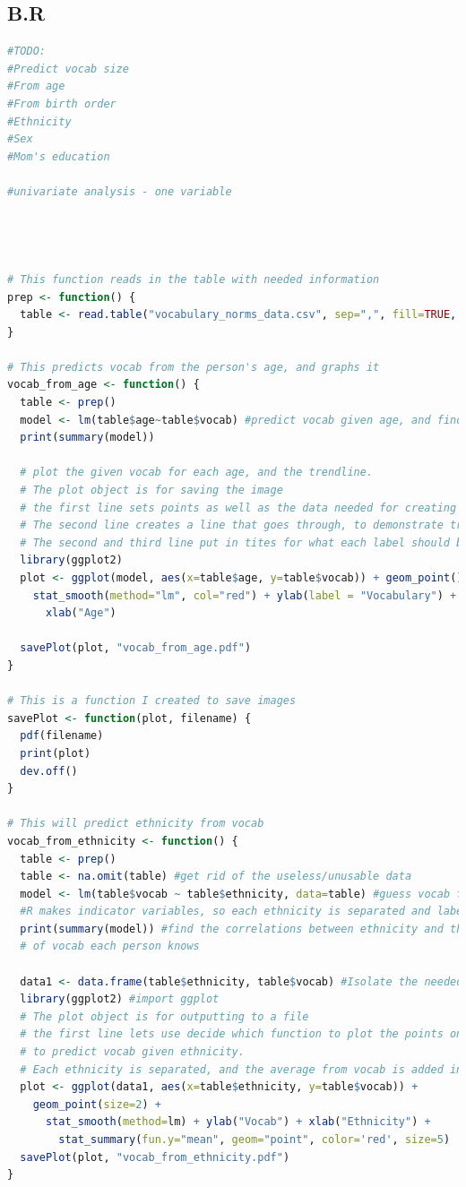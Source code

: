 \documentclass{article}
\begin{document}
    \subsection*{B.R}
        \begin{lstlisting}[language=R]
#TODO:
#Predict vocab size 
#From age
#From birth order
#Ethnicity
#Sex
#Mom's education

#univariate analysis - one variable




# This function reads in the table with needed information
prep <- function() {
  table <- read.table("vocabulary_norms_data.csv", sep=",", fill=TRUE, header=TRUE)
}

# This predicts vocab from the person's age, and graphs it
vocab_from_age <- function() {
  table <- prep()
  model <- lm(table$age~table$vocab) #predict vocab given age, and find correlation
  print(summary(model))

  # plot the given vocab for each age, and the trendline.
  # The plot object is for saving the image
  # the first line sets points as well as the data needed for creating the graph
  # The second line creates a line that goes through, to demonstrate trend.
  # The second and third line put in tites for what each label should be on the graph
  library(ggplot2)
  plot <- ggplot(model, aes(x=table$age, y=table$vocab)) + geom_point() + 
    stat_smooth(method="lm", col="red") + ylab(label = "Vocabulary") + 
      xlab("Age")

  savePlot(plot, "vocab_from_age.pdf")
}

# This is a function I created to save images
savePlot <- function(plot, filename) {
  pdf(filename)
  print(plot)
  dev.off()
}

# This will predict ethnicity from vocab
vocab_from_ethnicity <- function() {
  table <- prep()
  table <- na.omit(table) #get rid of the useless/unusable data
  model <- lm(table$vocab ~ table$ethnicity, data=table) #guess vocab from ethnicity
  #R makes indicator variables, so each ethnicity is separated and labeled
  print(summary(model)) #find the correlations between ethnicity and the amount
  # of vocab each person knows

  data1 <- data.frame(table$ethnicity, table$vocab) #Isolate the needed data
  library(ggplot2) #import ggplot 
  # The plot object is for outputting to a file
  # the first line lets use decide which function to plot the points on. It tries
  # to predict vocab given ethnicity. 
  # Each ethnicity is separated, and the average from vocab is added in
  plot <- ggplot(data1, aes(x=table$ethnicity, y=table$vocab)) +  
    geom_point(size=2) + 
      stat_smooth(method=lm) + ylab("Vocab") + xlab("Ethnicity") + 
        stat_summary(fun.y="mean", geom="point", color='red', size=5)
  savePlot(plot, "vocab_from_ethnicity.pdf")
}


\end{lstlisting}
\end{document}
